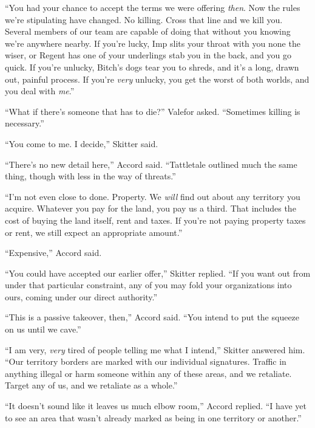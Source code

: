 ``You had your chance to accept the terms we were offering\emph{ then}.  Now the rules we're stipulating have changed.  No killing.  Cross that line and we kill you.  Several members of our team are capable of doing that without you knowing we're anywhere nearby.  If you're lucky, Imp slits your throat with you none the wiser, or Regent has one of your underlings stab you in the back, and you go quick.  If you're unlucky, Bitch's dogs tear you to shreds, and it's a long, drawn out, painful process.  If you're \emph{very} unlucky, you get the worst of both worlds, and you deal with \emph{me}.''



``What if there's someone that has to die?'' Valefor asked.  ``Sometimes killing is necessary.''



``You come to me.  I decide,'' Skitter said.



``There's no new detail here,'' Accord said.  ``Tattletale outlined much the same thing, though with less in the way of threats.''



``I'm not even close to done.  Property.  We \emph{will} find out about any territory you acquire.  Whatever you pay for the land, you pay us a third.  That includes the cost of buying the land itself, rent and taxes.  If you're not paying property taxes or rent, we still expect an appropriate amount.''



``Expensive,'' Accord said.



``You could have accepted our earlier offer,'' Skitter replied.  ``If you want out from under that particular constraint, any of you may fold your organizations into ours, coming under our direct authority.''



``This is a passive takeover, then,'' Accord said.  ``You intend to put the squeeze on us until we cave.''



``I am very, \emph{very} tired of people telling me what I intend,'' Skitter answered him.  ``Our territory borders are marked with our individual signatures.  Traffic in anything illegal or harm someone within any of these areas, and we retaliate.  Target any of us, and we retaliate as a whole.''



``It doesn't sound like it leaves us much elbow room,'' Accord replied.  ``I have yet to see an area that wasn't already marked as being in one territory or another.''



